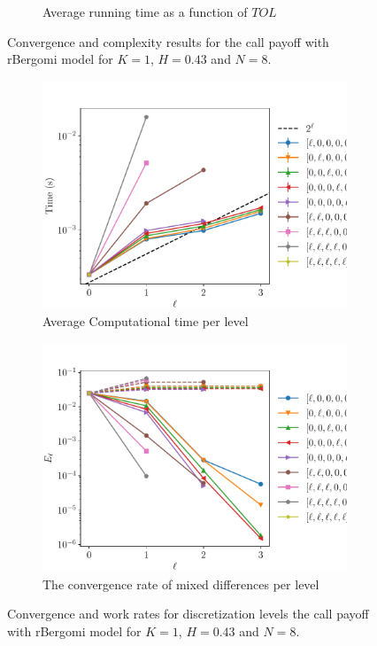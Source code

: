 \documentclass[11pt]{article}
\begin{document}
\begin{figure}[!h]
\begin{subfigure}{.4\textwidth}
		\caption{Average running time as a function of $TOL$}
		\label{fig:misc_rbergomi_8_steps_sub2}
	\end{subfigure}%
	\caption{Convergence and complexity results for the call payoff with rBergomi model for $K=1$, $H=0.43$ and $N=8$.}
	\label{fig:misc_rbergomi_8_steps_1}
\end{figure}



\begin{figure}[!h]
	\centering
	\begin{subfigure}{.4\textwidth}
		\centering
		\includegraphics[width=0.95\linewidth]{./figures/bergomi_misc/non_hierarchical/H_043/N_8/level_work.pdf}
		\caption{Average Computational time per level}
		\label{fig:misc_rbergomi_8_steps_sub3}
	\end{subfigure}%
	\begin{subfigure}{.4\textwidth}
		\centering
		\includegraphics[width=0.95\linewidth]{./figures/bergomi_misc/non_hierarchical/H_043/N_8/levels_error_rate.pdf}
		\caption{  The convergence rate of mixed differences per level}
		\label{fig:misc_rbergomi_8_steps_sub4}
	\end{subfigure}%
	\caption{Convergence and work rates for discretization levels  the call payoff with rBergomi model for $K=1$, $H=0.43$ and $N=8$.}
	\label{fig:misc_rbergomi_8_steps_2}
\end{figure}
\end{document}
